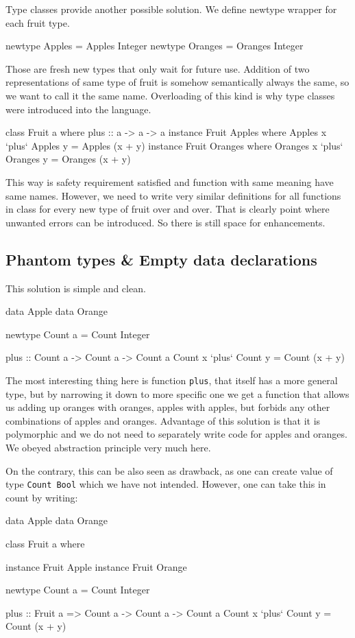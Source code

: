 \documentclass[11pt,oneside,draft]{fithesis2}
\theoremstyle{definition}
\begin{document}
Type classes provide another possible solution. We define newtype wrapper
for each fruit type.
\begin{code}
newtype Apples  = Apples  Integer
newtype Oranges = Oranges Integer
\end{code}

Those are fresh new types that only wait for future use.
Addition of two representations of same type of fruit is somehow semantically
always the same, so we want to call it the same name. Overloading of this kind is why
type classes were introduced into the language.
\begin{code}
class Fruit a where
    plus :: a -> a -> a
instance Fruit Apples where
	Apples x `plus` Apples y = Apples (x + y)
instance Fruit Oranges where
	Oranges x `plus` Oranges y = Oranges (x + y)
\end{code}

This way is safety requirement satisfied and function
with same meaning have same names. However, we need to write
very similar definitions for all functions in class
for every new type of fruit over and over. That is clearly
point where unwanted errors can be introduced. So there is still
space for enhancements.

\subsection{Phantom types \& Empty data declarations}

This solution is simple and clean.
\begin{code}
data Apple
data Orange

newtype Count a = Count Integer

plus :: Count a -> Count a -> Count a
Count x `plus` Count y = Count (x + y)
\end{code}
The most interesting thing here is function \texttt{plus}, that itself has a more general type, but
by narrowing it down to more specific one we get a function that allows us
adding up oranges with oranges, apples with apples, but forbids any other combinations
of apples and oranges. Advantage of this solution is that it is polymorphic
and we do not need to separately write code for apples and oranges.
We obeyed abstraction principle very much here.

On the contrary, this can be also seen as drawback, as one can create value
of type \texttt{Count Bool} which we have not intended. However,
one can take this in count by writing:
\begin{code}
data Apple
data Orange

class Fruit a where

instance Fruit Apple
instance Fruit Orange

newtype Count a = Count Integer

plus :: Fruit a => Count a -> Count a -> Count a
Count x `plus` Count y = Count (x + y)
\end{code}
\end{document}
